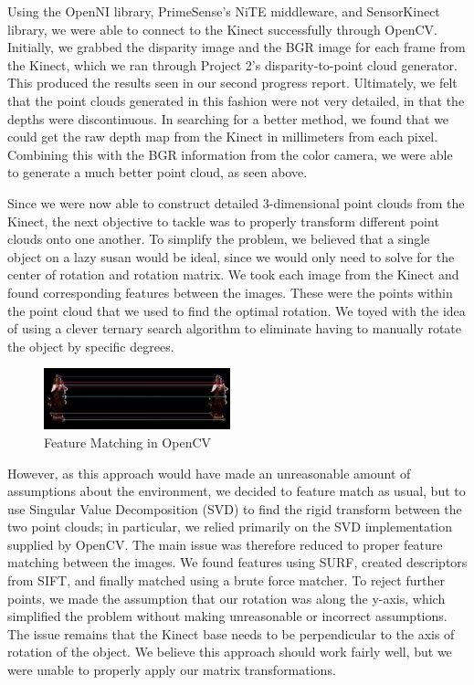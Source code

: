 \documentclass[11pt,oneside,english]{article}
\begin{document}
Using the OpenNI library, PrimeSense's NiTE middleware, and SensorKinect
library, we were able to connect to the Kinect successfully through OpenCV.
Initially, we grabbed the disparity image and the BGR image for each frame from
the Kinect, which we ran through Project 2's disparity-to-point cloud generator.
This produced the results seen in our second progress report. Ultimately, we
felt that the point clouds generated in this fashion were not very detailed, in
that the depths were discontinuous. In searching for a better method, we found
that we could get the raw depth map from the Kinect in millimeters from each
pixel. Combining this with the BGR information from the color camera, we were
able to generate a much better point cloud, as seen above.

Since we were now able to construct detailed 3-dimensional point clouds from the
Kinect, the next objective to tackle was to properly transform different point
clouds onto one another. To simplify the problem, we believed that a single
object on a lazy susan would be ideal, since we would only need to solve for the
center of rotation and rotation matrix. We took each image from the Kinect and
found corresponding features between the images. These were the points within
the point cloud that we used to find the optimal rotation. We toyed with the
idea of using a clever ternary search algorithm to eliminate having to manually
rotate the object by specific degrees.

\begin{figure}
  \begin{center}
    \includegraphics[width=0.48\textwidth]{feature}
  \end{center}
  \caption{Feature Matching in OpenCV}
\end{figure}

However, as this approach would have made an unreasonable amount of assumptions
about the environment, we decided to feature match as usual, but to use Singular
Value Decomposition (SVD) to find the rigid transform between the two point
clouds; in particular, we relied primarily on the SVD implementation supplied by
OpenCV. The main issue was therefore reduced to proper feature matching between
the images. We found features using SURF, created descriptors from SIFT, and
finally matched using a brute force matcher. To reject further points, we made
the assumption that our rotation was along the y-axis, which simplified the
problem without making unreasonable or incorrect assumptions. The issue remains
that the Kinect base needs to be perpendicular to the axis of rotation of the
object. We believe this approach should work fairly well, but we were unable to
properly apply our matrix transformations.
\end{document}
